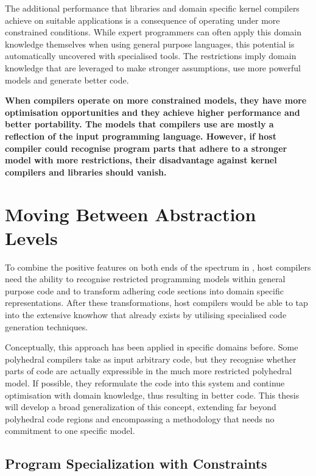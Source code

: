     The additional performance that libraries and domain specific kernel
    compilers achieve on suitable applications is a consequence of operating
    under more constrained conditions.
    While expert programmers can often apply this domain knowledge themselves
    when using general purpose languages, this potential is automatically
    uncovered with specialised tools.
    The restrictions imply domain knowledge that are leveraged to make stronger
    assumptions, use more powerful models and generate better code.

    {\bf
    When compilers operate on more constrained models, they have more
    optimisation opportunities and they achieve higher performance and better
    portability.
    The models that compilers use are mostly a reflection of the input
    programming language.
    However, if host compiler could recognise program parts that adhere
    to a stronger model with more restrictions, their disadvantage against
    kernel compilers and libraries should vanish.
    }

\section{Moving Between Abstraction Levels}

    To combine the positive features on both ends of the spectrum in
    , host compilers need the ability to recognise
    restricted programming models within general purpose code and to transform
    adhering code sections into domain specific representations.
    After these transformations, host compilers would be able to tap into the
    extensive knowhow that already exists by utilising specialised code
    generation techniques.

    Conceptually, this approach has been applied in specific domains before.
    Some polyhedral compilers take as input arbitrary code, but they recognise
    whether parts of code are actually expressible in the much more restricted
    polyhedral model.
    If possible, they reformulate the code into this system and continue
    optimisation with domain knowledge, thus resulting in better code.
    This thesis will develop a broad generalization of this concept, extending
    far beyond polyhedral code regions and encompassing a methodology that
    needs no commitment to one specific model.

\subsection{Program Specialization with Constraints}

